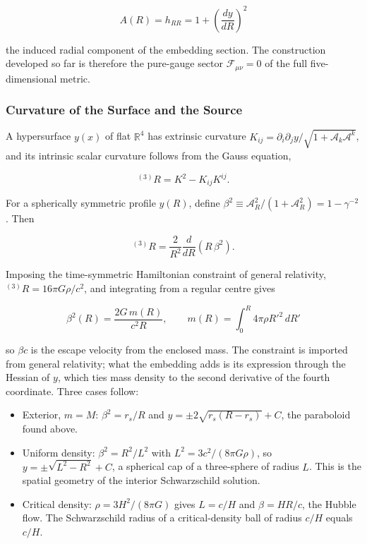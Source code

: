 \documentclass[pdflatex,sn-mathphys-num]{sn-jnl}%
\theoremstyle{thmstyleone}%
\theoremstyle{thmstyletwo}%
\theoremstyle{thmstylethree}%
\begin{document}
\begin{equation}
    A(R)=h_{RR}=1+\left(\frac{dy}{dR}\right)^2
\end{equation}

the induced radial component of the embedding section. The construction developed so far is therefore the pure-gauge sector $\mathcal{F}_{\mu\nu}=0$ of the full five-dimensional metric.


\subsubsection{Curvature of the Surface and the Source}

A hypersurface $y(x)$ of flat $\mathbb{R}^4$ has extrinsic curvature $K_{ij}=\partial_i\partial_j y/\sqrt{1+\mathcal{A}_k\mathcal{A}^k}$, and its intrinsic scalar curvature follows from the Gauss equation,

\begin{equation}
    {}^{(3)}\!R = K^2-K_{ij}K^{ij}.
\end{equation}

For a spherically symmetric profile $y(R)$, define $\beta^2\equiv\mathcal{A}_R^2/(1+\mathcal{A}_R^2)=1-\gamma^{-2}$. Then

\begin{equation}\label{eq_gauss_radial}
    {}^{(3)}\!R=\frac{2}{R^2}\frac{d}{dR}\left(R\,\beta^2\right).
\end{equation}

Imposing the time-symmetric Hamiltonian constraint of general relativity, ${}^{(3)}\!R=16\pi G\rho/c^2$, and integrating from a regular centre gives

\begin{equation}\label{eq_beta_enclosed}
    \boxed{
    \beta^2(R)=\frac{2G\,m(R)}{c^2R},
    \qquad
    m(R)=\int_0^R4\pi\rho R'^2\,dR'
    }
\end{equation}

so $\beta c$ is the escape velocity from the enclosed mass. The constraint is imported from general relativity; what the embedding adds is its expression through the Hessian of $y$, which ties mass density to the second derivative of the fourth coordinate. Three cases follow:

\begin{itemize}
\item Exterior, $m=M$: $\beta^2=r_s/R$ and $y=\pm2\sqrt{r_s(R-r_s)}+C$, the paraboloid found above.
\item Uniform density: $\beta^2=R^2/L^2$ with $L^2=3c^2/(8\pi G\rho)$, so $y=\pm\sqrt{L^2-R^2}+C$, a spherical cap of a three-sphere of radius $L$. This is the spatial geometry of the interior Schwarzschild solution.
\item Critical density: $\rho=3H^2/(8\pi G)$ gives $L=c/H$ and $\beta=HR/c$, the Hubble flow. The Schwarzschild radius of a critical-density ball of radius $c/H$ equals $c/H$.
\end{itemize}
\end{document}
